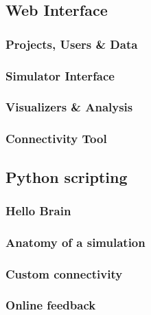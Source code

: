 
\subsection{Web Interface}

	\subsubsection{Projects, Users \& Data}

	\subsubsection{Simulator Interface}
	
	\subsubsection{Visualizers \& Analysis}

	\subsubsection{Connectivity Tool}

\subsection{Python scripting}

	\subsubsection{Hello Brain}

	\subsubsection{Anatomy of a simulation}

	\subsubsection{Custom connectivity}
		
	\subsubsection{Online feedback}

